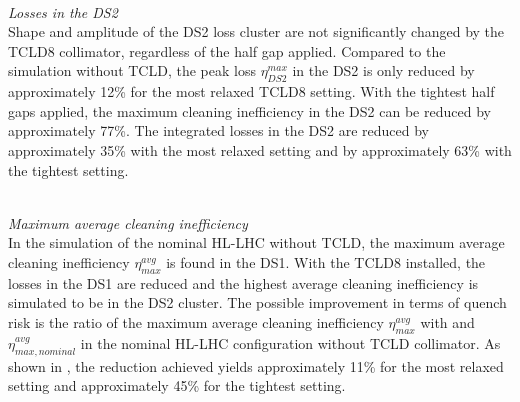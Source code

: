 %

\mbox{} \\ 
\textit{Losses in the DS2}\\ 
Shape and amplitude of the DS2 loss cluster are not significantly changed by the TCLD8 collimator, regardless of the half gap applied. Compared to the simulation without TCLD, the peak loss $\eta_{DS2}^{max}$ in the DS2 is only reduced by approximately 12\% for the most relaxed TCLD8 setting. With the tightest half gaps applied, the maximum cleaning inefficiency in the DS2 can be reduced by approximately 77\%. The integrated losses in the DS2 are reduced by approximately 35\% with the most relaxed setting and by approximately 63\% with the tightest setting. 

 \mbox{} \\ 
\textit{Maximum average cleaning inefficiency}\\ 
In the simulation of the nominal HL-LHC without TCLD, the maximum average cleaning inefficiency $\eta^{avg}_{max}$ is found in the DS1. With the TCLD8 installed, the losses in the DS1 are reduced and the highest average cleaning inefficiency is simulated to be in the DS2 cluster. The possible improvement in terms of quench risk is the ratio of the maximum average cleaning inefficiency $\eta^{avg}_{max}$ with and $\eta^{avg}_{max,nominal}$ in the nominal HL-LHC configuration without TCLD collimator. As shown in , the reduction achieved yields approximately 11\% for the most relaxed setting and approximately 45\% for the tightest setting. 






